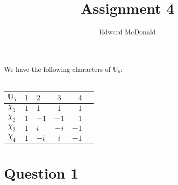 \documentclass{unswmaths}
\begin{document}
\subject{Number Theory}
\author{Edward McDonald}
\title{Assignment 4}


\setlength\parindent{0pt}

\newcommand{\Unit}{\mathbb{U}}
\newcommand{\modulo}[1]{\;\operatorname{mod}\;#1}
\newcommand{\pprime}{{p\text{ prime}}}

\unswtitle{}

    
    \begin{definition}
        We have the following characters of $\Unit_5$:
        \\
        \\        
        \begin{tabular}{| l | cl  cr | r |}
        \hline
        $\Unit_5$ & $1$ & $2$ & $3$ & $4$\\
        \hline
        $\chi_1$  & $1$ & $1$ & $1$ & $1$\\
        $\chi_2$  & $1$ & $-1$ & $-1$ & $1$\\
        $\chi_3$  & $1$ & $i$ & $-i$ & $-1$\\
        $\chi_4$  & $1$ & $-i$ & $i$ & $-1$\\
        \hline
        \end{tabular}
    \end{definition}
    

\section*{Question 1}
\end{document}
